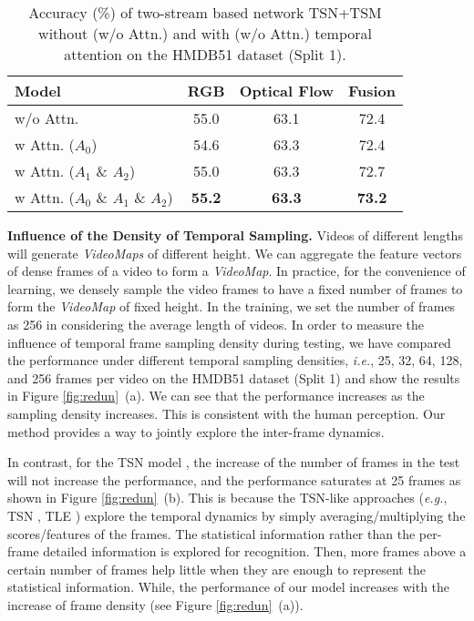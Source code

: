 \documentclass[english, 10pt, twocolumn, twoside]{IEEEtran}
\begin{document}
\begin{table*}[t]
	\caption{Accuracy (\%) of two-stream based network TSN+TSM without (w/o Attn.) and with (w/o Attn.) temporal attention on the HMDB51 dataset (Split 1).}
	\label{tab:attn}
	\fontsize{9pt}{10pt}\selectfont\centering
	\tabcolsep=14pt
	\begin{center}
		\begin{tabular}{|l|c|c|c|}
			\hline
			Model & RGB & Optical Flow & Fusion \\
			\hline\hline
			w/o Attn. & 55.0 & 63.1 & 72.4 \\
w Attn. ($A_0$) & 54.6 & 63.3 & 72.4\\
			w Attn. ($A_1$ \& $A_2$) & 55.0 & 63.3 & 72.7 \\
			w Attn. ($A_0$ \& $A_1$ \& $A_2$)& \textbf{55.2} & \textbf{63.3} & \textbf{73.2} \\
			\hline
		\end{tabular}
	\end{center}
\end{table*}









\noindent\textbf{Influence of the Density of Temporal Sampling.} Videos of different lengths will generate \emph{VideoMaps} of different height. We can aggregate the feature vectors of dense frames of a video to form a \emph{VideoMap}. In practice, for the convenience of learning, we densely sample the video frames to have a fixed number of frames to form the \emph{VideoMap} of fixed height. In the training, we set the number of frames as 256 in considering the average length of videos. In order to measure the influence of temporal frame sampling density during testing, we have compared the performance under different temporal sampling densities, \emph{i.e.}, 25, 32, 64, 128, and 256 frames per video on the HMDB51 dataset (Split 1) and show the results in Figure \ref{fig:redun}~(a). We can see that the performance increases as the sampling density increases. This is consistent with the human perception. Our method provides a way to jointly explore the inter-frame dynamics.





In contrast, for the TSN model \cite{wang2016temporal}, the increase of the number of frames in the test will not increase the performance,  and the performance saturates at 25 frames as shown in Figure \ref{fig:redun}~(b). This is because the TSN-like approaches (\emph{e.g.}, TSN \cite{wang2016temporal}, TLE \cite{diba2017deeptemporal}) explore the temporal dynamics by simply averaging/multiplying the scores/features of the frames. The statistical information rather than the per-frame detailed information is explored for recognition. Then, more frames above a certain number of frames help little when they are enough to represent the statistical information. While, the performance of our model increases with the increase of frame density (see Figure \ref{fig:redun}~(a)).
\end{document}
